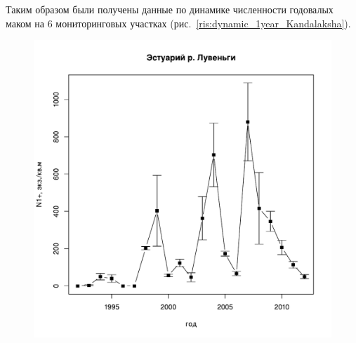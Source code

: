 Таким образом были получены данные по динамике численности годовалых маком на 6 мониторинговых участках (рис.~\ref{ris:dynamic_1year_Kandalaksha}).
	\begin{figure}[p]
	
	\begin{minipage}[b]{.49\linewidth}
	\begin{center}
	\includegraphics[width=\linewidth]{../White_Sea/Estuatiy_Luvenga/Estuary_N_oneyear1.pdf}


\end{center}
\end{minipage}
\end{figure}
